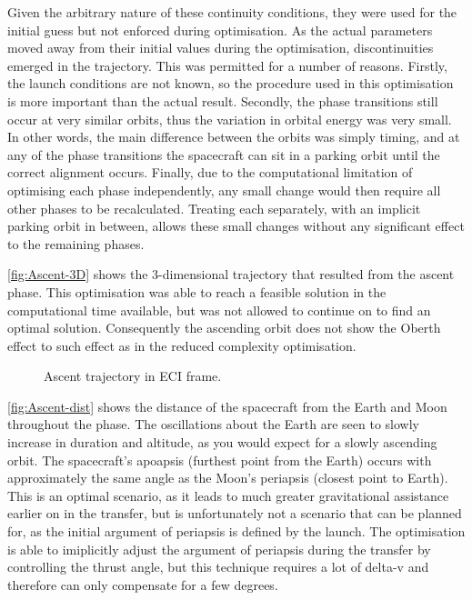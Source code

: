 Given the arbitrary nature of these continuity conditions, they were used for the initial guess but not enforced during optimisation. As the actual parameters moved away from their initial values during the optimisation, discontinuities emerged in the trajectory. This was permitted for a number of reasons. Firstly, the launch conditions are not known, so the procedure used in this optimisation is more important than the actual result. Secondly, the phase transitions still occur at very similar orbits, thus the variation in orbital energy was very small. In other words, the main difference between the orbits was simply timing, and at any of the phase transitions the spacecraft can sit in a parking orbit until the correct alignment occurs. Finally, due to the computational limitation of optimising each phase independently, any small change would then require all other phases to be recalculated. Treating each separately, with an implicit parking orbit in between, allows these small changes without any significant effect to the remaining phases.

\autoref{fig:Ascent-3D} shows the 3-dimensional trajectory that resulted from the ascent phase. This optimisation was able to reach a feasible solution in the computational time available, but was not allowed to continue on to find an optimal solution. Consequently the ascending orbit does not show the Oberth effect to such effect as in the reduced complexity optimisation.

\begin{figure}
\centering
\def\svgwidth{\figurewidth}

\caption{Ascent trajectory in ECI frame.}
\label{fig:Ascent-3D}
\end{figure}

\autoref{fig:Ascent-dist} shows the distance of the spacecraft from the Earth and Moon throughout the phase. The oscillations about the Earth are seen to slowly increase in duration and altitude, as you would expect for a slowly ascending orbit. The spacecraft's apoapsis (furthest point from the Earth) occurs with approximately the same angle as the Moon's periapsis (closest point to Earth). This is an optimal scenario, as it leads to much greater gravitational assistance earlier on in the transfer, but is unfortunately not a scenario that can be planned for, as the initial argument of periapsis is defined by the launch. The optimisation is able to imiplicitly adjust the argument of periapsis during the transfer by controlling the thrust angle, but this technique requires a lot of delta-v and therefore can only compensate for a few degrees.

